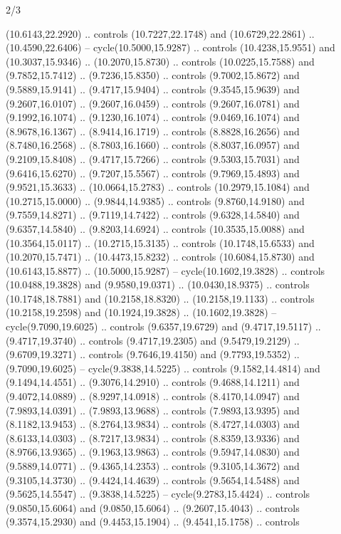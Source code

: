 \begin{flagdescription}{2/3}
\begin{scope}[yshift=\flagwidth,scale=\flagwidth/1241.93737]
\begin{scope}[y=-1mm, x=1mm,draw=gold,fill=blue,line join=miter,miter limit=4,line width=1.8\lw]
{  (10.6143,22.2920) .. controls (10.7227,22.1748) and (10.6729,22.2861) ..
  (10.4590,22.6406) -- cycle(10.5000,15.9287) .. controls (10.4238,15.9551) and
  (10.3037,15.9346) .. (10.2070,15.8730) .. controls (10.0225,15.7588) and
  (9.7852,15.7412) .. (9.7236,15.8350) .. controls (9.7002,15.8672) and
  (9.5889,15.9141) .. (9.4717,15.9404) .. controls (9.3545,15.9639) and
  (9.2607,16.0107) .. (9.2607,16.0459) .. controls (9.2607,16.0781) and
  (9.1992,16.1074) .. (9.1230,16.1074) .. controls (9.0469,16.1074) and
  (8.9678,16.1367) .. (8.9414,16.1719) .. controls (8.8828,16.2656) and
  (8.7480,16.2568) .. (8.7803,16.1660) .. controls (8.8037,16.0957) and
  (9.2109,15.8408) .. (9.4717,15.7266) .. controls (9.5303,15.7031) and
  (9.6416,15.6270) .. (9.7207,15.5567) .. controls (9.7969,15.4893) and
  (9.9521,15.3633) .. (10.0664,15.2783) .. controls (10.2979,15.1084) and
  (10.2715,15.0000) .. (9.9844,14.9385) .. controls (9.8760,14.9180) and
  (9.7559,14.8271) .. (9.7119,14.7422) .. controls (9.6328,14.5840) and
  (9.6357,14.5840) .. (9.8203,14.6924) .. controls (10.3535,15.0088) and
  (10.3564,15.0117) .. (10.2715,15.3135) .. controls (10.1748,15.6533) and
  (10.2070,15.7471) .. (10.4473,15.8232) .. controls (10.6084,15.8730) and
  (10.6143,15.8877) .. (10.5000,15.9287) -- cycle(10.1602,19.3828) .. controls
  (10.0488,19.3828) and (9.9580,19.0371) .. (10.0430,18.9375) .. controls
  (10.1748,18.7881) and (10.2158,18.8320) .. (10.2158,19.1133) .. controls
  (10.2158,19.2598) and (10.1924,19.3828) .. (10.1602,19.3828) --
  cycle(9.7090,19.6025) .. controls (9.6357,19.6729) and (9.4717,19.5117) ..
  (9.4717,19.3740) .. controls (9.4717,19.2305) and (9.5479,19.2129) ..
  (9.6709,19.3271) .. controls (9.7646,19.4150) and (9.7793,19.5352) ..
  (9.7090,19.6025) -- cycle(9.3838,14.5225) .. controls (9.1582,14.4814) and
  (9.1494,14.4551) .. (9.3076,14.2910) .. controls (9.4688,14.1211) and
  (9.4072,14.0889) .. (8.9297,14.0918) .. controls (8.4170,14.0947) and
  (7.9893,14.0391) .. (7.9893,13.9688) .. controls (7.9893,13.9395) and
  (8.1182,13.9453) .. (8.2764,13.9834) .. controls (8.4727,14.0303) and
  (8.6133,14.0303) .. (8.7217,13.9834) .. controls (8.8359,13.9336) and
  (8.9766,13.9365) .. (9.1963,13.9863) .. controls (9.5947,14.0830) and
  (9.5889,14.0771) .. (9.4365,14.2353) .. controls (9.3105,14.3672) and
  (9.3105,14.3730) .. (9.4424,14.4639) .. controls (9.5654,14.5488) and
  (9.5625,14.5547) .. (9.3838,14.5225) -- cycle(9.2783,15.4424) .. controls
  (9.0850,15.6064) and (9.0850,15.6064) .. (9.2607,15.4043) .. controls
  (9.3574,15.2930) and (9.4453,15.1904) .. (9.4541,15.1758) .. controls
}
\end{scope}
\end{scope}
\end{flagdescription}
